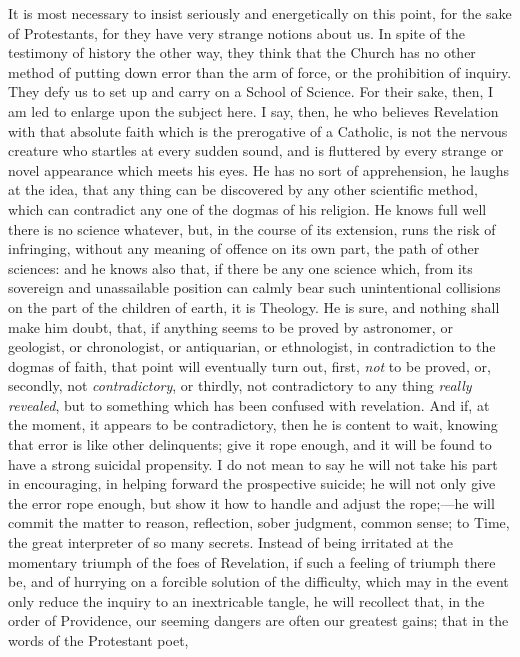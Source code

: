 It is most necessary to insist seriously and energetically on this
point, for the sake of Protestants, for they have very strange notions
about us. In spite of the testimony of history the other way, they
think that the Church has no other method of putting down error than
the arm of force, or the prohibition of inquiry. They defy us to set
up and carry on a School of Science. For their sake, then, I am led to
enlarge upon the subject here. I say, then, he who believes Revelation
with that absolute faith which is the prerogative of a Catholic, is
not the nervous creature who startles at every sudden sound, and is
fluttered by every strange or novel appearance which meets his eyes.
He has no sort of apprehension, he laughs at the idea, that any thing
can be discovered by any other scientific method, which can contradict
any one of the dogmas of his religion. He knows full well there is no
science whatever, but, in the course of its extension, runs the risk
of infringing, without any meaning of offence on its own part, the
path of other sciences: and he knows also that, if there be any one
science which, from its sovereign and unassailable position can calmly
bear such unintentional collisions on the part of the children of
earth, it is Theology. He is sure, and nothing shall make him doubt,
that, if anything seems to be proved by astronomer, or geologist, or
chronologist, or antiquarian, or ethnologist, in contradiction to the
dogmas of faith, that point will eventually turn out, first, \emph{not}
to be proved, or, secondly, not \emph{contradictory}, or thirdly, not
contradictory to any thing \emph{really revealed}, but to something
which has been confused with revelation. And if, at the moment, it
appears to be contradictory, then he is content to wait, knowing that
error is like other delinquents; give it rope enough, and it will be
found to have a strong suicidal propensity. I do not mean to say he
will not take his part in encouraging, in helping forward the
prospective suicide; he will not only give the error rope enough, but
show it how to handle and adjust the rope;—he will commit the matter
to reason, reflection, sober judgment, common sense; to Time, the
great interpreter of so many secrets. Instead of being irritated at
the momentary triumph of the foes of Revelation, if such a feeling of
triumph there be, and of hurrying on a forcible solution of the
difficulty, which may in the event only reduce the inquiry to an
inextricable tangle, he will recollect that, in the order of
Providence, our seeming dangers are often our greatest gains; that in
the words of the Protestant poet,

